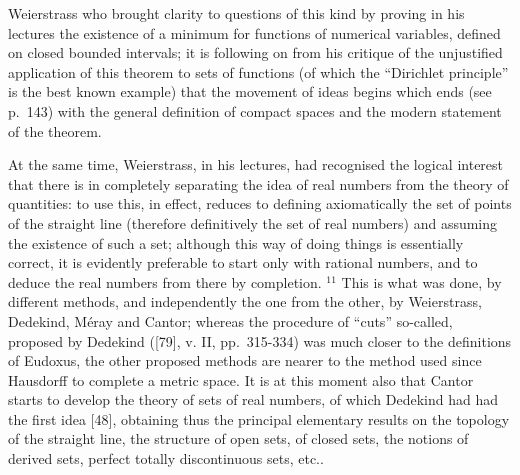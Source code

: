 Weierstrass who brought clarity to questions of this kind by proving in his lectures the existence of a minimum for functions of numerical variables, defined on closed bounded intervals; it is following on from his critique of the unjustified application of this theorem to sets of functions (of which the ``Dirichlet principle'' is the best known example) that the movement of ideas begins which ends (see p.~143) with the general definition of compact spaces and the modern statement of the theorem.

At the same time, Weierstrass, in his lectures, had recognised the logical interest that there is in completely separating the idea of real numbers from the theory of quantities: to use this, in effect, reduces to defining axiomatically the set of points of the straight line (therefore definitively the set of real numbers) and assuming the existence of such a set; although this way of doing things is essentially correct, it is evidently preferable to start only with rational numbers, and to deduce the real numbers from there by completion. \(^{11}\) This is what was done, by different methods, and independently the one from the other, by Weierstrass, Dedekind, Méray and Cantor; whereas the procedure of ``cuts'' so-called, proposed by Dedekind ({[}79{]}, v. II, pp.~315-334) was much closer to the definitions of Eudoxus, the other proposed methods are nearer to the method used since Hausdorff to complete a metric space. It is at this moment also that Cantor starts to develop the theory of sets of real numbers, of which Dedekind had had the first idea {[}48{]}, obtaining thus the principal elementary results on the topology of the straight line, the structure of open sets, of closed sets, the notions of derived sets, perfect totally discontinuous sets, etc..

